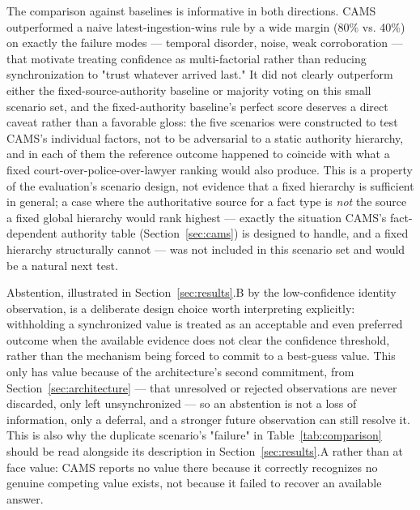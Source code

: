 \documentclass[conference]{IEEEtran}
\begin{document}
The comparison against baselines is informative in both directions. CAMS
outperformed a naive latest-ingestion-wins rule by a wide margin (80\% vs.
40\%) on exactly the failure modes --- temporal disorder, noise, weak
corroboration --- that motivate treating confidence as multi-factorial
rather than reducing synchronization to "trust whatever arrived last." It
did not clearly outperform either the fixed-source-authority baseline or
majority voting on this small scenario set, and the fixed-authority
baseline's perfect score deserves a direct caveat rather than a favorable
gloss: the five scenarios were constructed to test CAMS's individual
factors, not to be adversarial to a static authority hierarchy, and in each
of them the reference outcome happened to coincide with what a fixed
court-over-police-over-lawyer ranking would also produce. This is a
property of the evaluation's scenario design, not evidence that a fixed
hierarchy is sufficient in general; a case where the authoritative source
for a fact type is \emph{not} the source a fixed global hierarchy would
rank highest --- exactly the situation CAMS's fact-dependent authority
table (Section~\ref{sec:cams}) is designed to handle, and a fixed hierarchy
structurally cannot --- was not included in this scenario set and would be
a natural next test.

Abstention, illustrated in Section~\ref{sec:results}.B by the
low-confidence identity observation, is a deliberate design choice worth
interpreting explicitly: withholding a synchronized value is treated as an
acceptable and even preferred outcome when the available evidence does not
clear the confidence threshold, rather than the mechanism being forced to
commit to a best-guess value. This only has value because of the
architecture's second commitment, from Section~\ref{sec:architecture} ---
that unresolved or rejected observations are never discarded, only left
unsynchronized --- so an abstention is not a loss of information, only a
deferral, and a stronger future observation can still resolve it. This is
also why the duplicate scenario's "failure" in Table~\ref{tab:comparison}
should be read alongside its description in Section~\ref{sec:results}.A
rather than at face value: CAMS reports no value there because it
correctly recognizes no genuine competing value exists, not because it
failed to recover an available answer.
\end{document}
